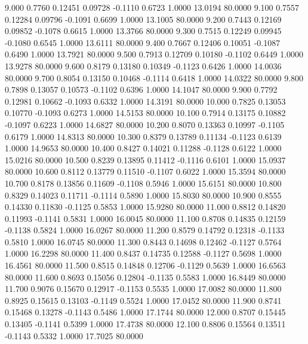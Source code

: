    9.000   0.7760   0.12451   0.09728  -0.1110   0.6723   1.0000  13.0194  80.0000
   9.100   0.7557   0.12284   0.09796  -0.1091   0.6699   1.0000  13.1005  80.0000
   9.200   0.7443   0.12169   0.09852  -0.1078   0.6615   1.0000  13.3766  80.0000
   9.300   0.7515   0.12249   0.09945  -0.1080   0.6545   1.0000  13.6111  80.0000
   9.400   0.7667   0.12406   0.10051  -0.1087   0.6490   1.0000  13.7921  80.0000
   9.500   0.7913   0.12709   0.10180  -0.1102   0.6449   1.0000  13.9278  80.0000
   9.600   0.8179   0.13180   0.10349  -0.1123   0.6426   1.0000  14.0036  80.0000
   9.700   0.8054   0.13150   0.10468  -0.1114   0.6418   1.0000  14.0322  80.0000
   9.800   0.7898   0.13057   0.10573  -0.1102   0.6396   1.0000  14.1047  80.0000
   9.900   0.7792   0.12981   0.10662  -0.1093   0.6332   1.0000  14.3191  80.0000
  10.000   0.7825   0.13053   0.10770  -0.1093   0.6273   1.0000  14.5153  80.0000
  10.100   0.7914   0.13175   0.10882  -0.1097   0.6223   1.0000  14.6827  80.0000
  10.200   0.8070   0.13363   0.10997  -0.1105   0.6179   1.0000  14.8313  80.0000
  10.300   0.8379   0.13789   0.11134  -0.1123   0.6139   1.0000  14.9653  80.0000
  10.400   0.8427   0.14021   0.11288  -0.1128   0.6122   1.0000  15.0216  80.0000
  10.500   0.8239   0.13895   0.11412  -0.1116   0.6101   1.0000  15.0937  80.0000
  10.600   0.8112   0.13779   0.11510  -0.1107   0.6022   1.0000  15.3594  80.0000
  10.700   0.8178   0.13856   0.11609  -0.1108   0.5946   1.0000  15.6151  80.0000
  10.800   0.8329   0.14023   0.11711  -0.1114   0.5890   1.0000  15.8030  80.0000
  10.900   0.8555   0.14330   0.11830  -0.1125   0.5853   1.0000  15.9280  80.0000
  11.000   0.8812   0.14820   0.11993  -0.1141   0.5831   1.0000  16.0045  80.0000
  11.100   0.8708   0.14835   0.12159  -0.1138   0.5824   1.0000  16.0267  80.0000
  11.200   0.8579   0.14792   0.12318  -0.1133   0.5810   1.0000  16.0745  80.0000
  11.300   0.8443   0.14698   0.12462  -0.1127   0.5764   1.0000  16.2298  80.0000
  11.400   0.8437   0.14735   0.12588  -0.1127   0.5698   1.0000  16.4561  80.0000
  11.500   0.8515   0.14848   0.12706  -0.1129   0.5639   1.0000  16.6563  80.0000
  11.600   0.8693   0.15056   0.12804  -0.1135   0.5583   1.0000  16.8449  80.0000
  11.700   0.9076   0.15670   0.12917  -0.1153   0.5535   1.0000  17.0082  80.0000
  11.800   0.8925   0.15615   0.13103  -0.1149   0.5524   1.0000  17.0452  80.0000
  11.900   0.8741   0.15468   0.13278  -0.1143   0.5486   1.0000  17.1744  80.0000
  12.000   0.8707   0.15445   0.13405  -0.1141   0.5399   1.0000  17.4738  80.0000
  12.100   0.8806   0.15564   0.13511  -0.1143   0.5332   1.0000  17.7025  80.0000
